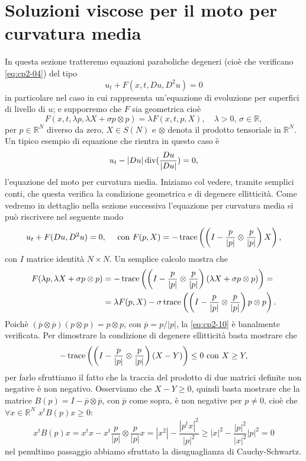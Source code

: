 \section{Soluzioni viscose per il moto per curvatura media}
In questa sezione tratteremo equazioni paraboliche degeneri (cioè che verificano \eqref{eq:cp2-04}) del tipo
\begin{equation}
  \label{eq:cp2-09}
u_t + F(x,t,Du,D^2u) = 0
\end{equation}
in particolare nel caso in cui rappresenta un'equazione di evoluzione per superfici di livello di $u$; e supporremo che $F$ sia geometrica cioè
\begin{equation}
  \label{eq:cp2-10}
F(x,t,\lambda p,\lambda X + \sigma p\otimes p) = \lambda F(x,t,p,X),\quad\lambda>0,\,\sigma\in\mathbb{R},
\end{equation}
per $p\in\mathbb{R}^N$ diverso da zero, $X\in S(N)$ e $\otimes$ denota il prodotto tensoriale in $\mathbb{R}^N$. Un tipico esempio di equazione che rientra in questo caso è
\[
u_t - |Du|\operatorname{div}(\frac{Du}{|Du|}) = 0,
\]
l'equazione del moto per curvatura media. Iniziamo col vedere, tramite semplici conti, che questa verifica la condizione geometrica e di degenere ellitticità.
Come vedremo in dettaglio nella sezione successiva l'equazione per curvatura media si può riscrivere nel seguente modo
\[
u_t+F(Du,D^2u)=0,\quad\text{ con }F(p,X) = -\operatorname{trace}\left(\left(I-\frac{p}{|p|}\otimes\frac{p}{|p|}\right)X\right),
\]
con $I$ matrice identità $N\times N$.
Un semplice calcolo mostra che
\[
\begin{aligned}
F(\lambda p,\lambda X +\sigma p\otimes p)&=-\operatorname{trace}\left(\left(I-\frac{p}{|p|}\otimes\frac{p}{|p|}\right)\left(\lambda X+\sigma p\otimes p\right)\right)=\\
&=\lambda F(p,X)-\sigma\operatorname{trace}\left(\left(I-\frac{p}{|p|}\otimes\frac{p}{|p|}\right)p\otimes p\right).
\end{aligned}
\]
Poichè $(\overline{p}\otimes\overline{p})(p\otimes p)=p\otimes p$, con $\overline{p}=p/|p|$, la \eqref{eq:cp2-10} è banalmente verificata. Per dimostrare la condizione di degenere ellitticità basta mostrare che
\[
-\operatorname{trace}\left(\left(I-\frac{p}{|p|}\otimes\frac{p}{|p|}\right)\left(X-Y\right)\right)\leq 0\text{ con }X\geq Y,
\]
per farlo sfruttiamo il fatto che la traccia del prodotto di due matrici definite non negative è non negativo. Osserviamo che $X-Y\geq 0$, quindi basta mostrare che la matrice $B(p)= I-\overline{p}\otimes\overline{p}$, con $\overline{p}$ come sopra, è non negative per $p\ne 0$, cioè che $\forall x\in\mathbb{R}^N$ $x^tB(p)x\geq 0$:
\[
x^tB(p)x=x^tx-x^t\frac{p}{|p|}\otimes\frac{p}{|p|}x=|x^2|-\frac{|p^tx|^2}{|p|^2}\geq |x|^2-\frac{|p|^2}{|x|^2}{|p|^2}=0
\]
nel penultimo passaggio abbiamo sfruttato la disuguaglianza di Cauchy-Schwartz.

